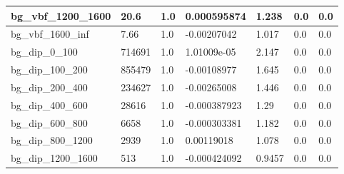 \documentclass[a4paper, 10pt]{article}
\begin{document}
\begin{table}[H]
\begin{center}
\begin{tabular}{|m{23.0mm}|m{23.0mm}|m{18.0mm}|m{19.0mm}|m{19.0mm}|m{19.0mm}|m{19.0mm}|}
      \hline
      {\cellcolor{white}         bg\_vbf\_1200\_1600}& {\cellcolor{white}         20.6}& {\cellcolor{white}         1.0}& {\cellcolor{white}         0.000595874}& {\cellcolor{white}         1.238}& {\cellcolor{green}         0.0}& {\cellcolor{green}         0.0}\\
      \hline
      {\cellcolor{white}         bg\_vbf\_1600\_inf}& {\cellcolor{white}         7.66}& {\cellcolor{white}         1.0}& {\cellcolor{white}         -0.00207042}& {\cellcolor{white}         1.017}& {\cellcolor{green}         0.0}& {\cellcolor{green}         0.0}\\
      \hline
      {\cellcolor{white}         bg\_dip\_0\_100}& {\cellcolor{white}         714691}& {\cellcolor{white}         1.0}& {\cellcolor{white}         1.01009e-05}& {\cellcolor{white}         2.147}& {\cellcolor{green}         0.0}& {\cellcolor{green}         0.0}\\
      \hline
      {\cellcolor{white}         bg\_dip\_100\_200}& {\cellcolor{white}         855479}& {\cellcolor{white}         1.0}& {\cellcolor{white}         -0.00108977}& {\cellcolor{white}         1.645}& {\cellcolor{green}         0.0}& {\cellcolor{green}         0.0}\\
      \hline
      {\cellcolor{white}         bg\_dip\_200\_400}& {\cellcolor{white}         234627}& {\cellcolor{white}         1.0}& {\cellcolor{white}         -0.00265008}& {\cellcolor{white}         1.446}& {\cellcolor{green}         0.0}& {\cellcolor{green}         0.0}\\
      \hline
      {\cellcolor{white}         bg\_dip\_400\_600}& {\cellcolor{white}         28616}& {\cellcolor{white}         1.0}& {\cellcolor{white}         -0.000387923}& {\cellcolor{white}         1.29}& {\cellcolor{green}         0.0}& {\cellcolor{green}         0.0}\\
      \hline
      {\cellcolor{white}         bg\_dip\_600\_800}& {\cellcolor{white}         6658}& {\cellcolor{white}         1.0}& {\cellcolor{white}         -0.000303381}& {\cellcolor{white}         1.182}& {\cellcolor{green}         0.0}& {\cellcolor{green}         0.0}\\
      \hline
      {\cellcolor{white}         bg\_dip\_800\_1200}& {\cellcolor{white}         2939}& {\cellcolor{white}         1.0}& {\cellcolor{white}         0.00119018}& {\cellcolor{white}         1.078}& {\cellcolor{green}         0.0}& {\cellcolor{green}         0.0}\\
      \hline
      {\cellcolor{white}         bg\_dip\_1200\_1600}& {\cellcolor{white}         513}& {\cellcolor{white}         1.0}& {\cellcolor{white}         -0.000424092}& {\cellcolor{white}         0.9457}& {\cellcolor{green}         0.0}& {\cellcolor{green}         0.0}\\

\end{tabular}
\end{center}
\end{table}
\end{document}
